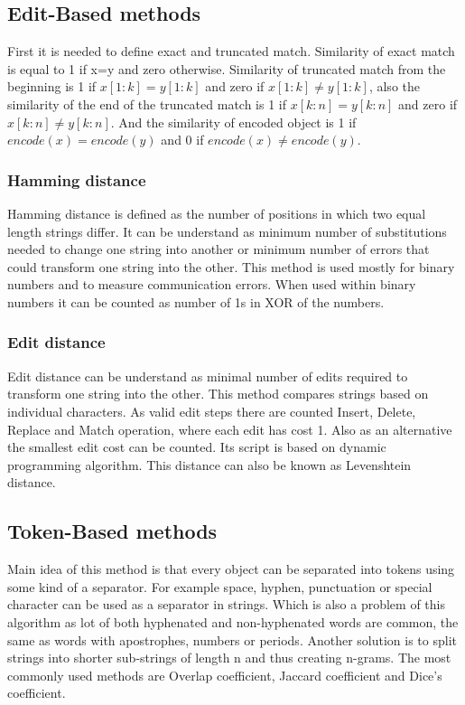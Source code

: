 \subsection{Edit-Based methods}
First it is needed to define exact and truncated match. Similarity of exact match is equal to 1 if x=y and zero otherwise. Similarity of truncated match from the beginning is 1 if $x[1:k] = y[1:k]$ and zero if $x[1:k] \neq y[1:k]$, also the similarity of the end of the truncated match is 1 if $x[k:n] = y[k:n]$ and zero if $x[k:n] \neq y[k:n]$. And the similarity of encoded object is 1 if $encode(x)=encode(y)$ and 0 if $encode(x) \neq encode (y)$. \cite{sim2Dstrings}
\subsubsection{Hamming distance}
Hamming distance is defined as the number of positions in which two equal length strings differ. It can be understand as minimum number of substitutions needed to change one string into another or minimum number of errors that could transform one string into the other.
This method is used mostly for binary numbers and to measure communication errors. When used within binary numbers it can be counted as number of 1s in XOR of the numbers.
\subsubsection{Edit distance}
Edit distance can be understand as minimal number of edits required to transform one string into the other. This method compares strings based on individual characters. As valid edit steps there are counted Insert, Delete, Replace and Match operation, where each edit has cost 1. Also as an alternative the smallest edit cost can be counted. Its script is based on dynamic programming algorithm. This distance can also be known as Levenshtein distance.
\subsection{Token-Based methods}
Main idea of this method is that every object can be separated into tokens using some kind of a separator. For example space, hyphen, punctuation or special character can be used as a separator in strings. Which is also a problem of this algorithm as lot of both hyphenated and non-hyphenated words are common, the same as words with apostrophes, numbers or periods. Another solution is to split strings into shorter sub-strings of length n and thus creating n-grams.
The most commonly used methods are Overlap coefficient, Jaccard coefficient and Dice's coefficient.
